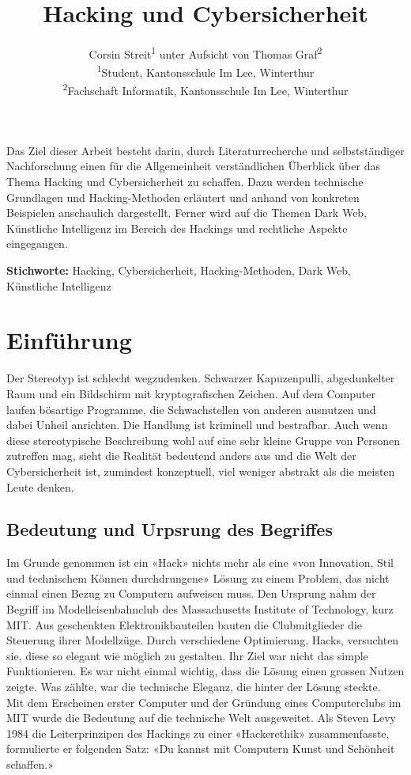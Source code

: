 \documentclass[12pt, a4paper]{article}
\title{\articletype{Maturitätsarbeit} Hacking und Cybersicherheit}
\author{Corsin Streit\textsuperscript{1} unter Aufsicht von Thomas Graf\textsuperscript{2} \\
{\footnotesize \textsuperscript{1}Student, Kantonsschule Im Lee, Winterthur} \\
{\footnotesize \textsuperscript{2}Fachschaft Informatik, Kantonsschule Im Lee, Winterthur}}
\date{}
\renewenvironment{abstract}
  {\begin{mdframed}[
    backgroundcolor=gray!20, 
    innertopmargin=10pt, 
    innerbottommargin=15pt, 
    innerleftmargin=15pt, 
    innerrightmargin=15pt, 
    linewidth=0pt, 
    roundcorner=0pt,
    frametitleaboveskip=5mm, 
    frametitlebelowskip=-1mm, 
    frametitle={\bfseries Abstrakt}, 
    frametitlefont={\bfseries},
    frametitlealignment=\raggedright
    ]
   \vspace{2mm}}
  {\end{mdframed}}
\newcommand{\keywords}[1]{
  \vspace{12pt} 
  \par\noindent\textbf{Stichworte:} #1
}
\begin{document}
\maketitle
\thispagestyle{firstpage}


\begin{abstract}
Das Ziel dieser Arbeit besteht darin, durch Literaturrecherche und selbstständiger Nachforschung einen für die Allgemeinheit verständlichen Überblick über das Thema Hacking und Cybersicherheit zu schaffen. Dazu werden technische Grundlagen und Hacking-Methoden erläutert und anhand von konkreten Beispielen anschaulich dargestellt. Ferner wird auf die Themen Dark Web, Künstliche Intelligenz im Bereich des Hackings und rechtliche Aspekte eingegangen.
\end{abstract}

\keywords{Hacking, Cybersicherheit, Hacking-Methoden, Dark Web, Künstliche Intelligenz}

\newpage
\tableofcontents
\newpage



\section{Einführung}
Der Stereotyp ist schlecht wegzudenken. Schwarzer Kapuzenpulli, abgedunkelter Raum und ein Bildschirm mit kryptografischen Zeichen. Auf dem Computer laufen bösartige Programme, die Schwachstellen von anderen ausnutzen und dabei Unheil anrichten. Die Handlung ist kriminell und bestrafbar. Auch wenn diese stereotypische Beschreibung wohl auf eine sehr kleine Gruppe von Personen zutreffen mag, sieht die Realität bedeutend anders aus und die Welt der Cybersicherheit ist, zumindest konzeptuell, viel weniger abstrakt als die meisten Leute denken. 

\subsection{Bedeutung und Urpsrung des Begriffes}
Im Grunde genommen ist ein «Hack» nichts mehr als eine «von Innovation, Stil und technischem Können durchdrungene» Lösung zu einem Problem, das nicht einmal einen Bezug zu Computern aufweisen muss. Den Ursprung nahm der Begriff im Modelleisenbahnclub des Massachusetts Institute of Technology, kurz MIT. Aus geschenkten Elektronikbauteilen bauten die Clubmitglieder die Steuerung ihrer Modellzüge. Durch verschiedene Optimierung, Hacks, versuchten sie, diese so elegant wie möglich zu gestalten. Ihr Ziel war nicht das simple Funktionieren. Es war nicht einmal wichtig, dass die Lösung einen grossen Nutzen zeigte. Was zählte, war die technische Eleganz, die hinter der Lösung steckte. \\Mit dem Erscheinen erster Computer und der Gründung eines Computerclubs im MIT wurde die Bedeutung auf die technische Welt ausgeweitet. Als Steven Levy 1984 die Leiterprinzipen des Hackings zu einer «Hackerethik» zusammenfasste, formulierte er folgenden Satz: «Du kannst mit Computern Kunst und Schönheit schaffen.» \cite{bpbKleineGeschichte:online}
\end{document}
